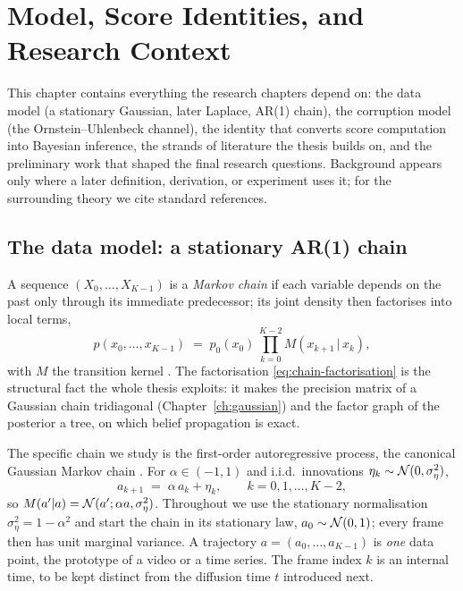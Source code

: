 \chapter{Model, Score Identities, and Research Context}
\label{ch:background}\label{ch:statmech}\label{ch:stochproc}\label{ch:sde}\label{ch:diffusion}\label{ch:ebm}

This chapter contains everything the research chapters depend on: the data
model (a stationary Gaussian, later Laplace, AR(1) chain), the corruption
model (the Ornstein--Uhlenbeck channel), the identity that converts score
computation into Bayesian inference, the strands of literature the thesis
builds on, and the preliminary work that shaped the final research
questions. Background appears only where a later definition, derivation, or
experiment uses it; for the surrounding theory we cite standard references.

\section{The data model: a stationary AR(1) chain}\label{sec:ar1}

A sequence $(X_0, \dots, X_{K-1})$ is a \emph{Markov chain} if each variable
depends on the past only through its immediate predecessor; its joint
density then factorises into local terms,
\begin{equation}
  p(x_0, \dots, x_{K-1})
  \;=\; p_0(x_0)\, \prod_{k=0}^{K-2} M(x_{k+1} \,|\, x_k),
  \label{eq:chain-factorisation}
\end{equation}
with $M$ the transition kernel \citep{robert2004monte}. The factorisation
\eqref{eq:chain-factorisation} is the structural fact the whole thesis
exploits: it makes the precision matrix of a Gaussian chain tridiagonal
(Chapter~\ref{ch:gaussian}) and the factor graph of the posterior a tree,
on which belief propagation is exact.

The specific chain we study is the first-order autoregressive process, the
canonical Gaussian Markov chain \citep{brockwell1991time}. For
$\alpha \in (-1, 1)$ and i.i.d.\ innovations
$\eta_k \sim \mathcal{N}(0, \sigma_\eta^2)$,
\begin{equation}
  a_{k+1} \;=\; \alpha\, a_k + \eta_k ,
  \qquad k = 0, 1, \dots, K-2 ,
  \label{eq:ar1}
\end{equation}
so $M(a' | a) = \mathcal{N}(a'; \alpha a, \sigma_\eta^2)$. Throughout we use the
stationary normalisation $\sigma_\eta^2 = 1 - \alpha^2$ and start the chain
in its stationary law, $a_0 \sim \mathcal{N}(0,1)$; every frame then has unit
marginal variance. A trajectory $a = (a_0, \dots, a_{K-1})$ is \emph{one}
data point, the prototype of a video or a time series. The frame index $k$
is an internal time, to be kept distinct from the diffusion time $t$
introduced next.

